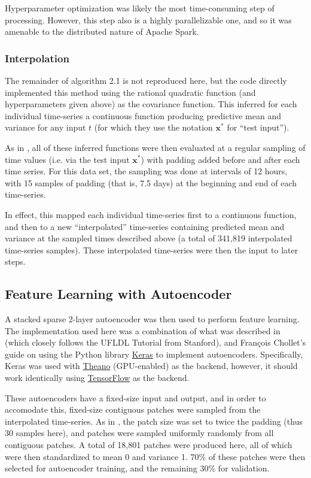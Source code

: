 \documentclass[journal]{IEEEtran}
\begin{document}
Hyperparameter optimization was likely the most time-consuming step of
processing.  However, this step also is a highly parallelizable one,
and so it was amenable to the distributed nature of Apache Spark.

\subsubsection{Interpolation}

The remainder of algorithm 2.1 is not reproduced here, but the code
directly implemented this method using the rational quadratic function
(and hyperparameters given above) as the covariance function.  This
inferred for each individual time-series a continuous function
producing predictive mean and variance for any input $t$ (for which
they use the notation $\mathbf{x^*}$ for ``test input'').

As in \cite{Lasko2013}, all of these inferred functions were then
evaluated at a regular sampling of time values (i.e. via the test
input $\mathbf{x^*}$) with padding added before and after each time
series.  For this data set, the sampling was done at intervals of 12
hours, with 15 samples of padding (that is, 7.5 days) at the beginning
and end of each time-series.

In effect, this mapped each individual time-series first to a
continuous function, and then to a new ``interpolated'' time-series
containing predicted mean and variance at the sampled times described
above (a total of 341,819 interpolated time-series samples).  These
interpolated time-series were then the input to later steps.

\subsection{Feature Learning with Autoencoder}

A stacked sparse 2-layer autoencoder was then used to perform feature
learning.  The implementation used here was a combination of what was
described in \cite{Lasko2013} (which closely follows the UFLDL
Tutorial from Stanford\cite{Ng}), and Fran\c cois Chollet's
guide\cite{Chollet} on using the Python library
\href{https://keras.io/}{Keras} to implement autoencoders.
Specifically, Keras was used with
\href{http://deeplearning.net/software/theano/}{Theano} (GPU-enabled)
as the backend, however, it should work identically using
\href{https://www.tensorflow.org/}{TensorFlow} as the backend.

These autoencoders have a fixed-size input and output, and in order to
accomodate this, fixed-size contiguous patches were sampled from the
interpolated time-series.  As in \cite{Lasko2013}, the patch size was
set to twice the padding (thus 30 samples here), and patches were
sampled uniformly randomly from all contiguous patches.  A total of
18,801 patches were produced here, all of which were then standardized
to mean 0 and variance 1.  70\% of these patches were then selected
for autoencoder training, and the remaining 30\% for validation.
\end{document}

